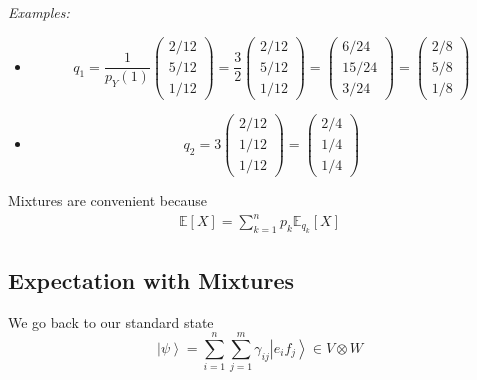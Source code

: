 \documentclass[12pt]{article}
\newcommand{\ket}[1]{\left\vert #1 \right\rangle}
\newcommand{\E}{\mathbb{E}}
\begin{document}
        \emph{Examples:}
        \begin{itemize}
            \item 
            \[q_1 = \frac{1}{p_Y(1)} \begin{pmatrix}
                2/12\\
                5/12\\
                1/12
            \end{pmatrix} = \frac{3}{2} \begin{pmatrix}
                2/12\\
                5/12\\
                1/12
            \end{pmatrix} = \begin{pmatrix}
                6/24\\
                15/24\\
                3/24
            \end{pmatrix} = \begin{pmatrix}
                2/8\\
                5/8\\
                1/8
            \end{pmatrix}\]

            \item 
            \[q_2 = 3 \begin{pmatrix}
                2/12\\
                1/12\\
                1/12
            \end{pmatrix} = \begin{pmatrix}
                2/4\\
                1/4\\
                1/4
            \end{pmatrix}\]
        \end{itemize}

        Mixtures are convenient because 
        \begin{align*}
            \E[X] = \sum_{k=1}^n p_k \E_{q_k}[X]
        \end{align*}

    \subsection*{Expectation with Mixtures}
        We go back to our standard state 
        \[\ket \psi = \sum_{i=1}^n \sum_{j=1}^m \gamma_{ij} \ket{e_i f_j} \in V\otimes W\]
\end{document}
